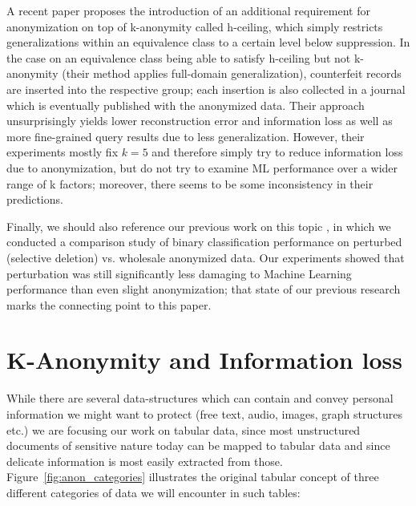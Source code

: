 \documentclass{llncs}
\begin{document}
A recent paper \cite{LeeHCeiling2017} proposes the introduction of an additional requirement for anonymization on top of k-anonymity called h-ceiling, which simply restricts generalizations within an equivalence class to a certain level below suppression. In the case on an equivalence class being able to satisfy h-ceiling but not k-anonymity (their method applies full-domain generalization), counterfeit records are inserted into the respective group; each insertion is also collected in a journal which is eventually published with the anonymized data. Their approach unsurprisingly yields lower reconstruction error and information loss as well as more fine-grained query results due to less generalization. However, their experiments mostly fix $k=5$ and therefore simply try to reduce information loss due to anonymization, but do not try to examine ML performance over a wider range of k factors; moreover, there seems to be some inconsistency in their predictions.

Finally, we should also reference our previous work on this topic \cite{malle2016right}, in which we conducted a comparison study of binary classification performance on perturbed (selective deletion) vs. wholesale anonymized data. Our experiments showed that perturbation was still significantly less damaging to Machine Learning performance than even slight anonymization; that state of our previous research marks the connecting point to this paper.



\section{K-Anonymity and Information loss}

While there are several data-structures which can contain and convey personal information we might want to protect (free text, audio, images, graph structures etc.) we are focusing our work on tabular data, since most unstructured documents of sensitive nature today can be mapped to tabular data and since delicate information is most easily extracted from those. Figure~\ref{fig:anon_categories} illustrates the original tabular concept of three different categories of data we will encounter in such tables:
\end{document}
